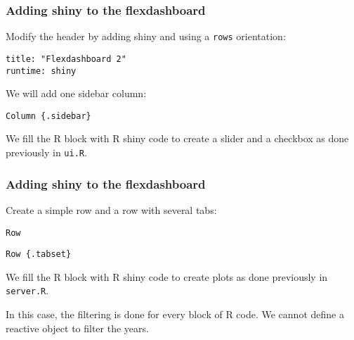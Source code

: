 \documentclass{beamer}
\begin{document}
	\begin{frame}[fragile]
		\frametitle{Adding shiny to the flexdashboard}

		Modify the header by adding shiny and using a \verb|rows| orientation:
		
		\begin{exampleblock}{}
		\begin{BVerbatim}
title: "Flexdashboard 2"
runtime: shiny
		\end{BVerbatim}
		\end{exampleblock}{}

		\vspace{2em}

		We will add one sidebar column:
		
		\begin{exampleblock}{}
		\begin{BVerbatim}
Column {.sidebar}
		\end{BVerbatim}
		\end{exampleblock}{}

		\vspace{2em}

		We fill the R block with R shiny code to create a slider and a checkbox as done previously in \verb|ui.R|.

	\end{frame}

	\begin{frame}[fragile]
		\frametitle{Adding shiny to the flexdashboard}

		Create a simple row and a row with several tabs:
		
		\begin{exampleblock}{}
		\begin{BVerbatim}
Row
		\end{BVerbatim}
		\end{exampleblock}{}

		\begin{exampleblock}{}
		\begin{BVerbatim}
Row {.tabset}
		\end{BVerbatim}
		\end{exampleblock}{}

		\vspace{2em}

		We fill the R block with R shiny code to create plots as done previously in \verb|server.R|.

		\vspace{2em}

		In this case, the filtering is done for every block of R code. We cannot define a reactive object to filter the years.
 	
	\end{frame}
\end{document}
